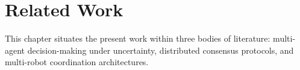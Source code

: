 \chapter{Related Work}
\label{ch:related}

This chapter situates the present work within three bodies of literature:
multi-agent decision-making under uncertainty, distributed consensus protocols,
and multi-robot coordination architectures.
